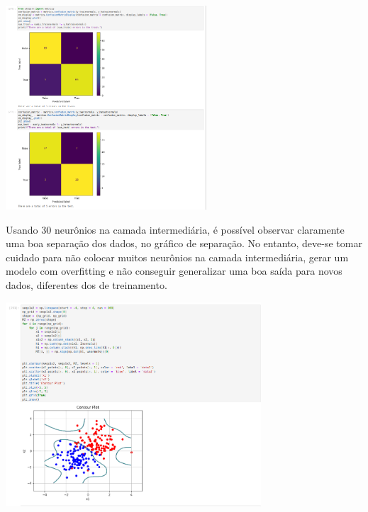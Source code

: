 \documentclass{article}
\begin{document}
\begin{center}

\includegraphics[height=3in]{exercise_pic/normals/conf_matrix_normals10.png}
\vspace{10pt}
    
\end{center}
Usando 30 neurônios na camada intermediária, é possível observar claramente uma boa separação dos dados, no gráfico de separação. No entanto, deve-se tomar cuidado para não colocar muitos neurônios na camada intermediária, gerar um modelo com overfitting e não conseguir generalizar uma boa saída para novos dados, diferentes dos de treinamento.

\begin{center}

\includegraphics[height=3in]{exercise_pic/normals/sep_plot_normals30.png}
\vspace{10pt}

\end{center}
\end{document}
